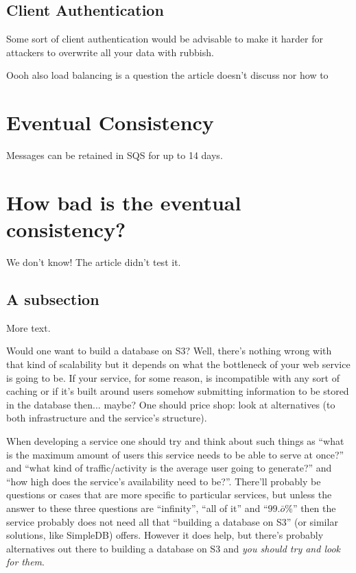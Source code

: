 \documentclass[11pt]{article}
\begin{document}
\subsection{Client Authentication}
Some sort of client authentication would be advisable to make it harder for attackers to overwrite all your data with rubbish.



Oooh also load balancing is a question the article doesn't discuss nor how to 

\section{Eventual Consistency}
Messages can be retained in SQS for up to 14 days.

\section{How bad is the eventual consistency?}
We don't know! The article didn't test it.

\subsection{A subsection}

More text.

Would one want to build a database on S3?
Well, there's nothing wrong with that kind of scalability but it depends on what the bottleneck of your web service is going to be.
If your service, for some reason, is incompatible with any sort of caching or if it's built around users somehow submitting information to be stored in the database then... maybe?
One should price shop: look at alternatives (to both infrastructure and the service's structure).

When developing a service one should try and think about such things as ``what is the maximum amount of users this service needs to be able to serve at once?'' and ``what kind of traffic/activity is the average user going to generate?'' and ``how high does the service's availability need to be?''.
There'll probably be questions or cases that are more specific to particular services, but unless the answer to these three questions are ``infinity'', ``all of it'' and ``$99.\bar{o}\%$'' then the service probably does not need all that ``building a database on S3'' (or similar solutions, like SimpleDB) offers.
However it does help, but there's probably alternatives out there to building a database on S3 and \textit{you should try and look for them}.
\end{document}
